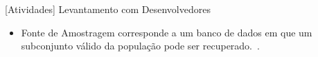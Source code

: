 \documentclass[t,14pt,mathserif]{beamer}
\begin{document}
\begin{frame}{[Atividades] Levantamento com Desenvolvedores}

    \begin{itemize}
        \item Fonte de Amostragem corresponde a um banco de dados em que um
              subconjunto válido da população pode ser
              recuperado.~\cite{de2014towards}.
    \end{itemize}

    \begin{table}[htpb]
        \centering
        \caption{Fontes de Amostragem utilizadas no estudo}
\label{tab:fontes-amostragens}
    \end{table}
\end{frame}
\end{document}
